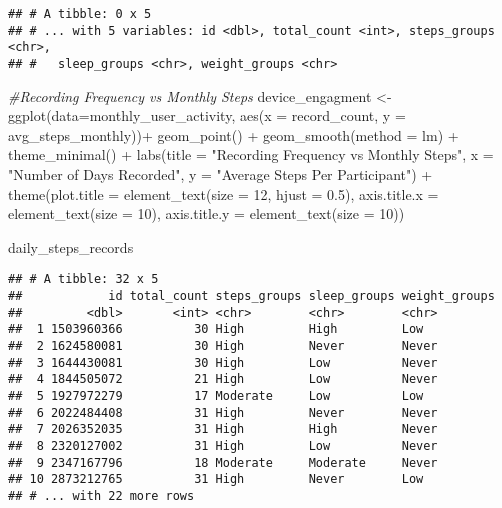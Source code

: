 \documentclass[
]{article}
\newenvironment{Shaded}{\begin{snugshade}}{\end{snugshade}}
\newcommand{\AttributeTok}[1]{\textcolor[rgb]{0.77,0.63,0.00}{#1}}
\newcommand{\CommentTok}[1]{\textcolor[rgb]{0.56,0.35,0.01}{\textit{#1}}}
\newcommand{\DecValTok}[1]{\textcolor[rgb]{0.00,0.00,0.81}{#1}}
\newcommand{\FloatTok}[1]{\textcolor[rgb]{0.00,0.00,0.81}{#1}}
\newcommand{\FunctionTok}[1]{\textcolor[rgb]{0.00,0.00,0.00}{#1}}
\newcommand{\NormalTok}[1]{#1}
\newcommand{\OtherTok}[1]{\textcolor[rgb]{0.56,0.35,0.01}{#1}}
\newcommand{\SpecialCharTok}[1]{\textcolor[rgb]{0.00,0.00,0.00}{#1}}
\newcommand{\StringTok}[1]{\textcolor[rgb]{0.31,0.60,0.02}{#1}}
\begin{document}
\begin{verbatim}
## # A tibble: 0 x 5
## # ... with 5 variables: id <dbl>, total_count <int>, steps_groups <chr>,
## #   sleep_groups <chr>, weight_groups <chr>
\end{verbatim}

\begin{Shaded}
\begin{Highlighting}[]
  \CommentTok{\#Recording Frequency vs Monthly Steps                                                         }
\NormalTok{device\_engagment }\OtherTok{\textless{}{-}} \FunctionTok{ggplot}\NormalTok{(}\AttributeTok{data=}\NormalTok{monthly\_user\_activity, }\FunctionTok{aes}\NormalTok{(}\AttributeTok{x =}\NormalTok{ record\_count, }\AttributeTok{y =}\NormalTok{ avg\_steps\_monthly))}\SpecialCharTok{+}
                    \FunctionTok{geom\_point}\NormalTok{() }\SpecialCharTok{+}
                    \FunctionTok{geom\_smooth}\NormalTok{(}\AttributeTok{method =}\NormalTok{ lm) }\SpecialCharTok{+}
                    \FunctionTok{theme\_minimal}\NormalTok{() }\SpecialCharTok{+}
                    \FunctionTok{labs}\NormalTok{(}\AttributeTok{title =} \StringTok{"Recording Frequency vs Monthly Steps"}\NormalTok{, }
                         \AttributeTok{x =} \StringTok{"Number of Days Recorded"}\NormalTok{, }\AttributeTok{y =} \StringTok{"Average Steps Per Participant"}\NormalTok{) }\SpecialCharTok{+}
                    \FunctionTok{theme}\NormalTok{(}\AttributeTok{plot.title =} \FunctionTok{element\_text}\NormalTok{(}\AttributeTok{size =} \DecValTok{12}\NormalTok{, }\AttributeTok{hjust =} \FloatTok{0.5}\NormalTok{),}
                          \AttributeTok{axis.title.x =} \FunctionTok{element\_text}\NormalTok{(}\AttributeTok{size =} \DecValTok{10}\NormalTok{),}
                          \AttributeTok{axis.title.y =} \FunctionTok{element\_text}\NormalTok{(}\AttributeTok{size =} \DecValTok{10}\NormalTok{)) }

\NormalTok{daily\_steps\_records}
\end{Highlighting}
\end{Shaded}

\begin{verbatim}
## # A tibble: 32 x 5
##            id total_count steps_groups sleep_groups weight_groups
##         <dbl>       <int> <chr>        <chr>        <chr>        
##  1 1503960366          30 High         High         Low          
##  2 1624580081          30 High         Never        Never        
##  3 1644430081          30 High         Low          Never        
##  4 1844505072          21 High         Low          Never        
##  5 1927972279          17 Moderate     Low          Low          
##  6 2022484408          31 High         Never        Never        
##  7 2026352035          31 High         High         Never        
##  8 2320127002          31 High         Low          Never        
##  9 2347167796          18 Moderate     Moderate     Never        
## 10 2873212765          31 High         Never        Low          
## # ... with 22 more rows
\end{verbatim}
\end{document}
